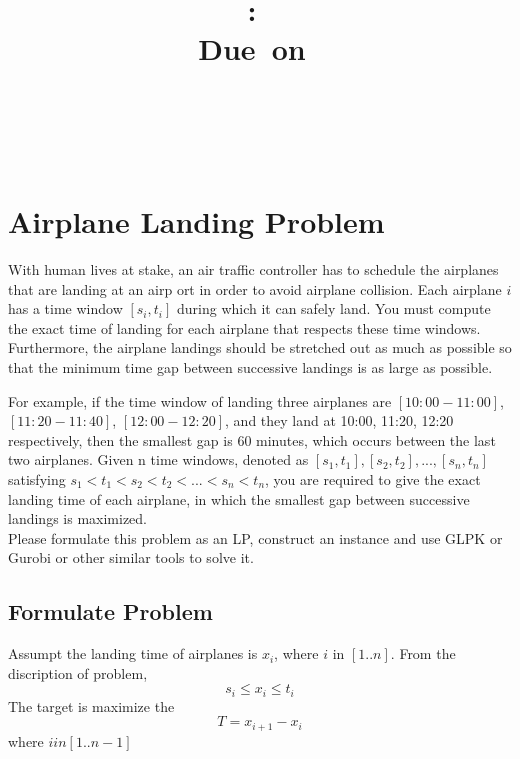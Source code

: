 \documentclass{article}
\title{
\vspace{2in}
\textmd{\textbf{\hmwkClass:\ \hmwkTitle}}\\
\normalsize\vspace{0.1in}\small{Due\ on\ \hmwkDueDate}\\
\vspace{0.1in}\large{\textit{\hmwkClassInstructor\ \hmwkClassTime}}
\vspace{3in}
}
\author{\textbf{\hmwkAuthorName}\\\textbf{\hmwkAuthorStuID}}
\date{} %
\numberwithin{equation}{section}
\begin{document}
\maketitle
\newpage


%
%
\section{Airplane Landing Problem}
With human lives at stake, an air traffic controller has to schedule the airplanes
that are landing at an airp ort in order to avoid airplane collision. Each airplane
$i$ has a time window $[s_i,t_i]$ during which it can safely land. You must compute
the exact time of landing for each airplane that respects these time windows.
Furthermore, the airplane landings should be stretched out as much as possible
so that the minimum time gap between successive landings is as large as possible.

For example, if the time window of landing three airplanes are $[10:00-11:00]$,
$[11:20-11:40]$, $[12:00-12:20]$, and they land at 10:00, 11:20, 12:20 respectively,
then the smallest gap is 60 minutes, which occurs between the last two airplanes.
Given n time windows, denoted as $[s_1,t_1], [s_2,t_2],..., [s_n,t_n]$ satisfying $s_1 <
t_1 < s_2 < t_2 < ... < s_n < t_n$, you are required to give the exact landing
time of each airplane, in which the smallest gap between successive landings is
maximized.\\
Please formulate this problem as an LP, construct an instance and use GLPK
or Gurobi or other similar tools to solve it.
\subsection{Formulate Problem}
Assumpt the landing time of airplanes is $x_i$, where $i$ in $[1..n]$.
From the discription of problem, $$ s_i \leq x_i \leq t_i $$ The target is maximize the
$$T = x_{i+1} - x_i $$  where $i in [1..n-1]$
\end{document}
